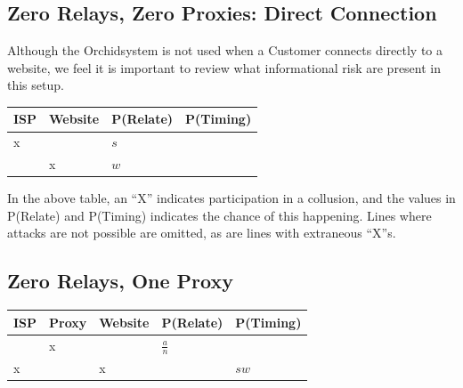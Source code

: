 \documentclass{article}
\newcommand{\orchid}{Orchid}
\newcommand{\Orchid}{\orchid}
\begin{document}
\subsection{Zero Relays, Zero Proxies: Direct Connection}

Although the \Orchid system is not used when a Customer connects
directly to a website, we feel it is important to review what
informational risk are present in this setup.

\begin{center}
\begin{tabular}{l | l | l | l}
  ISP & Website & P(Relate)          & P(Timing) \\
  \hline
  x   &         & $s$                & \\
  \hline
      & x       & $w$                & \\
\end{tabular}
\end{center}


In the above table, an ``X'' indicates participation in a collusion,
and the values in P(Relate) and P(Timing) indicates the chance of this
happening. Lines where attacks are not possible are omitted, as are
lines with extraneous ``X''s.

\subsection{Zero Relays, One Proxy}


\begin{center}
\begin{tabular}{l | l | l | l | l}
  ISP & Proxy & Website & P(Relate)          & P(Timing) \\
  \hline
      & x     &         & $\frac{a}{n}$      & \\
  \hline
  x   &       & x       &                    & $sw$ \\
\end{tabular}
\end{center}
\end{document}
